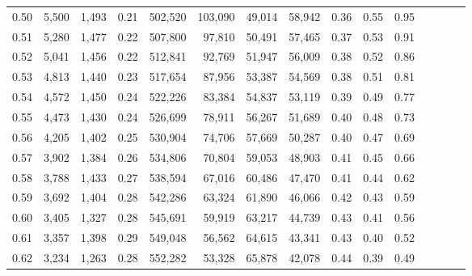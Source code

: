 \begin{tabular}{rrrcrrrrrrrrrrr}
0.50 &   5,500 &   1,493 &                                       0.21 &  502,520 &  103,090 &   49,014 &   58,942 &  0.36 &  0.55 &                         0.95 \\
0.51 &   5,280 &   1,477 &                                       0.22 &  507,800 &   97,810 &   50,491 &   57,465 &  0.37 &  0.53 &                         0.91 \\
0.52 &   5,041 &   1,456 &                                       0.22 &  512,841 &   92,769 &   51,947 &   56,009 &  0.38 &  0.52 &                         0.86 \\
0.53 &   4,813 &   1,440 &                                       0.23 &  517,654 &   87,956 &   53,387 &   54,569 &  0.38 &  0.51 &                         0.81 \\
0.54 &   4,572 &   1,450 &                                       0.24 &  522,226 &   83,384 &   54,837 &   53,119 &  0.39 &  0.49 &                         0.77 \\
0.55 &   4,473 &   1,430 &                                       0.24 &  526,699 &   78,911 &   56,267 &   51,689 &  0.40 &  0.48 &                         0.73 \\
0.56 &   4,205 &   1,402 &                                       0.25 &  530,904 &   74,706 &   57,669 &   50,287 &  0.40 &  0.47 &                         0.69 \\
0.57 &   3,902 &   1,384 &                                       0.26 &  534,806 &   70,804 &   59,053 &   48,903 &  0.41 &  0.45 &                         0.66 \\
0.58 &   3,788 &   1,433 &                                       0.27 &  538,594 &   67,016 &   60,486 &   47,470 &  0.41 &  0.44 &                         0.62 \\
0.59 &   3,692 &   1,404 &                                       0.28 &  542,286 &   63,324 &   61,890 &   46,066 &  0.42 &  0.43 &                         0.59 \\
0.60 &   3,405 &   1,327 &                                       0.28 &  545,691 &   59,919 &   63,217 &   44,739 &  0.43 &  0.41 &                         0.56 \\
0.61 &   3,357 &   1,398 &                                       0.29 &  549,048 &   56,562 &   64,615 &   43,341 &  0.43 &  0.40 &                         0.52 \\
0.62 &   3,234 &   1,263 &                                       0.28 &  552,282 &   53,328 &   65,878 &   42,078 &  0.44 &  0.39 &                         0.49 \\

\end{tabular}

